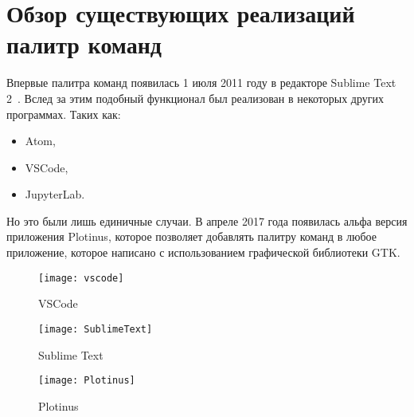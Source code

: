 \chapter{Обзор существующих реализаций палитр команд}

Впервые палитра команд появилась 1 июля 2011 году в редакторе Sublime Text
2~\cite{sublimetext2changelog}. Вслед за этим подобный функционал был реализован
в некоторых других программах. Таких как:
\begin{itemize}
	\item Atom\cite{atom},
	\item VSCode\cite{vscode},
	\item JupyterLab\cite{jupyterlab}.
\end{itemize}

Но это были лишь единичные случаи. В апреле 2017 года появилась альфа версия
приложения Plotinus\cite{plotinus}, которое позволяет добавлять палитру команд в
любое приложение, которое написано с использованием графической библиотеки GTK.

\begin{figure}
	\texttt{[image: vscode]}
	\caption{VSCode}
\end{figure}

\begin{figure}
	\texttt{[image: SublimeText]}
	\caption{Sublime Text}
\end{figure}

\begin{figure}
	\texttt{[image: Plotinus]}
	\caption{Plotinus}
\end{figure}

